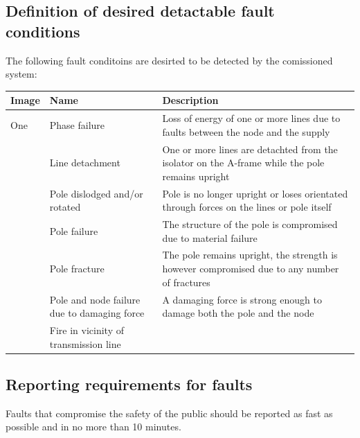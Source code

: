 \documentclass[12pt]{article}
\begin{document}
\subsection{Definition of desired detactable fault conditions}
The following fault conditoins are desirted to be detected by the comissioned system:

\begin{center}
\begin{table}[htp]
  
  \hskip-2.2cm\begin{tabular}{|p{4cm}|p{4cm}|p{10cm}|}
      \hline
      \textbf{Image} & \textbf{Name} & \textbf{Description} \\
      \hline
      One & Phase failure & Loss of energy of one or more lines due to faults between the node and the supply \\
       & Line detachment & One or more lines are detachted from the isolator on the A-frame while the pole remains
       upright \\
       & Pole dislodged and/or rotated & Pole is no longer upright or loses orientated through forces on the lines or pole itself \\
       & Pole failure & The structure of the pole is compromised due to material failure \\
       & Pole fracture & The pole remains upright, the strength is however compromised due to any number of fractures \\
       & Pole and node failure due to damaging force & A damaging force is strong enough to damage both the pole and the
       node\\
       & Fire in vicinity of transmission line & \\
      \hline

  \end{tabular}    

\label{tab:summary_measurments}
\end{table}
\end{center}


\subsection{Reporting requirements for faults}
Faults that compromise the safety of the public should be reported as fast as possible and in no more than 10 minutes.
\end{document}
